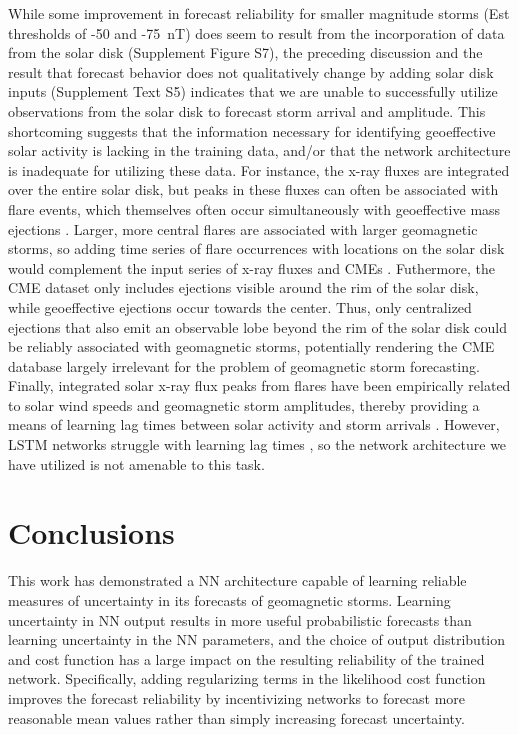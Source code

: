 \documentclass[draft,linenumbers]{agujournal2018}
\begin{document}
While some improvement in forecast reliability for smaller magnitude storms (Est thresholds of -50 and -75~nT) does seem to result from the incorporation of data from the solar disk (Supplement Figure S7), the preceding discussion and the result that forecast behavior does not qualitatively change by adding solar disk inputs (Supplement Text S5) indicates that we are unable to successfully utilize observations from the solar disk to forecast storm arrival and amplitude. This shortcoming suggests that the information necessary for identifying geoeffective solar activity is lacking in the training data, and/or that the network architecture is inadequate for utilizing these data. For instance, the x-ray fluxes are integrated over the entire solar disk, but peaks in these fluxes can often be associated with flare events, which themselves often occur simultaneously with geoeffective mass ejections \citep{Tobiska2013}. Larger, more central flares are associated with larger geomagnetic storms, so adding time series of flare occurrences with locations on the solar disk would complement the input series of x-ray fluxes and CMEs \citep{Tobiska2013}. Futhermore, the CME dataset only includes ejections visible around the rim of the solar disk, while geoeffective ejections occur towards the center. Thus, only centralized ejections that also emit an observable lobe beyond the rim of the solar disk could be reliably associated with geomagnetic storms, potentially rendering the CME database largely irrelevant for the problem of geomagnetic storm forecasting. Finally, integrated solar x-ray flux peaks from flares have been empirically related to solar wind speeds and geomagnetic storm amplitudes, thereby providing a means of learning lag times between solar activity and storm arrivals \citep{Tobiska2013}. However, LSTM networks struggle with learning lag times \citep{Gers2002}, so the network architecture we have utilized is not amenable to this task.  

\section{Conclusions}
% 
This work has demonstrated a NN architecture capable of learning reliable measures of uncertainty in its forecasts of geomagnetic storms. Learning uncertainty in NN output results in more useful probabilistic forecasts than learning uncertainty in the NN parameters, and the choice of output distribution and cost function has a large impact on the resulting reliability of the trained network. Specifically, adding regularizing terms in the likelihood cost function improves the forecast reliability by incentivizing networks to forecast more reasonable mean values rather than simply increasing forecast uncertainty.
\end{document}
